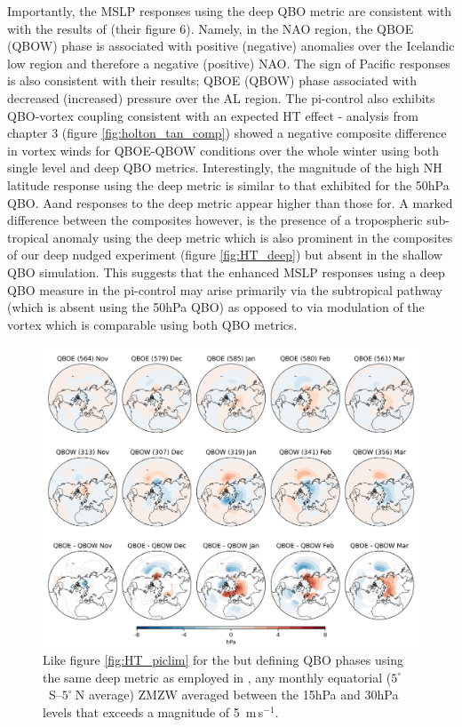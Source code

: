 Importantly, the MSLP responses using the deep QBO metric are consistent with with the results of \cite{andrewsObserved2019d} (their figure 6). Namely, in the NAO region, the QBOE (QBOW) phase is associated with positive (negative) anomalies over the Icelandic low region and therefore a negative (positive) NAO. The sign of Pacific responses is also consistent with their results; QBOE (QBOW) phase associated with decreased (increased) pressure over the AL region. The pi-control also exhibits QBO-vortex coupling consistent with an expected HT effect - analysis from chapter 3 (figure \ref{fig:holton_tan_comp}) showed a negative composite difference in vortex winds for QBOE-QBOW conditions over the whole winter using both single level and deep QBO metrics. Interestingly, the magnitude of the high NH latitude response using the deep metric is similar to that exhibited for the 50hPa QBO. Aand responses to the deep metric appear higher than those for. A marked difference between the composites however, is the presence of a tropospheric sub-tropical anomaly using the deep metric which is also prominent in the composites of our deep nudged experiment (figure \ref{fig:HT_deep}) but absent in the shallow QBO simulation. This suggests that the enhanced MSLP responses using a deep QBO measure in the pi-control may arise primarily via the subtropical pathway (which is absent using the 50hPa QBO) as opposed to via modulation of the vortex which is comparable using both QBO metrics. 


\begin{figure}[h!]
\begin{center}
\noindent\includegraphics[width = 0.8\linewidth]{Figures/Figures-deepQBO/SLP_composites_individual_months_QBO_phases_U_picontrol_deephPa_5thresh.png}
\caption[]{Like figure \ref{fig:HT_piclim} for the but defining QBO phases using the same deep metric as employed in \cite{andrewsObserved2019d}, any monthly equatorial ($5^{\circ}$\ S--$5^{\circ}\ $N average) ZMZW averaged between the 15hPa and 30hPa levels that exceeds a magnitude of 5\ m\,s$^{-1}$.}
\label{fig:SLP_picontrol_deep}
\end{center}
\end{figure}



